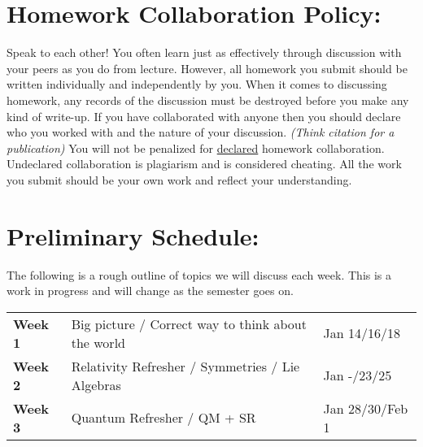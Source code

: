 \documentclass[margin,line]{res}
\begin{document}
\begin{resume}
\section{Homework Collaboration Policy:} 

Speak to each other!
You often learn just as effectively through discussion with your peers as you do from lecture. 
However, all homework you submit should be written individually and independently by you.
When it comes to discussing homework, any records of the discussion must be destroyed before you make any kind of write-up. 
If you have collaborated with anyone then you should declare who you worked with and the nature of your discussion. 
\textit{(Think citation for a publication)}
You will not be penalized for \underline{declared} homework collaboration. 
Undeclared collaboration is plagiarism and is considered cheating. 
All the work you submit should be your own work and reflect your understanding.


\section{Preliminary Schedule:}

The following is a rough outline of topics we will discuss each week. 
This is a work in progress and will change as the semester goes on.

\begin{tabular}{lll}
\textbf{Week 1}  & Big picture / Correct way to think about the world & Jan 14/16/18 \\
\textbf{Week 2}  & Relativity Refresher / Symmetries /  Lie Algebras & Jan -/23/25 \\
\textbf{Week 3}  & Quantum Refresher / QM + SR   & Jan 28/30/Feb 1 \\
\end{tabular}

\end{resume}
\end{document}
